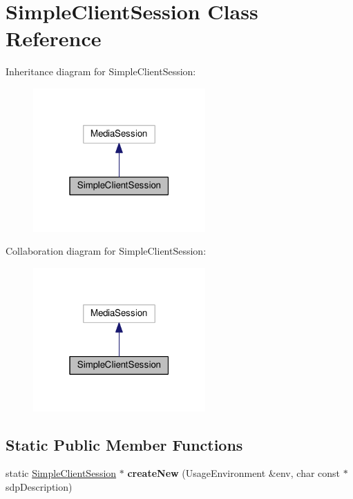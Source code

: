 \hypertarget{classSimpleClientSession}{}\section{Simple\+Client\+Session Class Reference}
\label{classSimpleClientSession}


Inheritance diagram for Simple\+Client\+Session\+:\nopagebreak
\begin{figure}[H]
\begin{center}
\leavevmode
\includegraphics[width=187pt]{classSimpleClientSession__inherit__graph}
\end{center}
\end{figure}


Collaboration diagram for Simple\+Client\+Session\+:\nopagebreak
\begin{figure}[H]
\begin{center}
\leavevmode
\includegraphics[width=187pt]{classSimpleClientSession__coll__graph}
\end{center}
\end{figure}
\subsection*{Static Public Member Functions}
\begin{DoxyCompactItemize}
\item 
static \hyperlink{classSimpleClientSession}{Simple\+Client\+Session} $\ast$ {\bfseries create\+New} (Usage\+Environment \&env, char const $\ast$sdp\+Description)\hypertarget{classSimpleClientSession_a85c05f448f72e56e71e6154e8b87f63f}{}\label{classSimpleClientSession_a85c05f448f72e56e71e6154e8b87f63f}

\end{DoxyCompactItemize}

